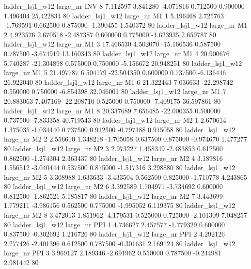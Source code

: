     ladder_lsj1_w12   large_nr      INV                 8  7.112597  3.841280  -4.071816 0.712500 0.900000  1.496404   25.422834 80
    ladder_lsj1_w12   large_nr       M1                 1  5.196468  2.725763  -1.769591 0.662500 0.875000 -1.390455    1.540372 80
    ladder_lsj1_w12   large_nr       M1                 2  4.923576  2.670518  -2.487387 0.600000 0.775000 -1.623935    2.659787 80
    ladder_lsj1_w12   large_nr       M1                 3 17.466530  4.502070 -15.166536 0.587500 0.787500 -3.674919   13.160343 80
    ladder_lsj1_w12   large_nr       M1                 4 20.900676  5.740287 -21.304898 0.575000 0.750000 -5.156672   20.948251 80
    ladder_lsj1_w12   large_nr       M1                 5 21.497787  6.504179 -22.504350 0.600000 0.737500 -6.136446   26.922040 80
    ladder_lsj1_w12   large_nr       M1                 6 21.322443  7.036633 -22.298742 0.550000 0.750000 -6.854398   32.046001 80
    ladder_lsj1_w12   large_nr       M1                 7 20.883063  7.407169 -22.208710 0.525000 0.750000 -7.409175   36.597861 80
    ladder_lsj1_w12   large_nr       M1                 8 20.337689  7.656485 -22.000355 0.500000 0.737500 -7.833358   40.719543 80
    ladder_lsj1_w12   large_nr       M2                 1  2.670614  1.375035  -1.034440 0.737500 0.912500 -0.797188    0.915058 80
    ladder_lsj1_w12   large_nr       M2                 2  2.556610  1.348218  -1.705058 0.637500 0.875000 -0.974670    1.477277 80
    ladder_lsj1_w12   large_nr       M2                 3  2.973227  1.458349  -2.483853 0.612500 0.862500 -1.274304    2.363437 80
    ladder_lsj1_w12   large_nr       M2                 4  3.189816  1.556512  -3.040444 0.537500 0.875000 -1.517316    3.298880 80
    ladder_lsj1_w12   large_nr       M2                 5  3.308988  1.633633  -3.433504 0.562500 0.825000 -1.710778    4.243865 80
    ladder_lsj1_w12   large_nr       M2                 6  3.392589  1.704971  -3.734692 0.600000 0.812500 -1.862521    5.185817 80
    ladder_lsj1_w12   large_nr       M2                 7  3.443699  1.779211  -3.986156 0.562500 0.775000 -1.995052    6.119375 80
    ladder_lsj1_w12   large_nr       M2                 8  3.472013  1.851962  -4.179531 0.525000 0.725000 -2.101309    7.048257 80
    ladder_lsj1_w12   large_nr      PPI                 1  4.736627  2.457577  -1.779329 0.600000 0.837500 -0.302692    1.216726 80
    ladder_lsj1_w12   large_nr      PPI                 2  4.292126  2.277426  -2.401396 0.612500 0.787500 -0.301631    2.169124 80
    ladder_lsj1_w12   large_nr      PPI                 3  3.969127  2.189346  -2.691962 0.550000 0.787500 -0.244981    2.981442 80
